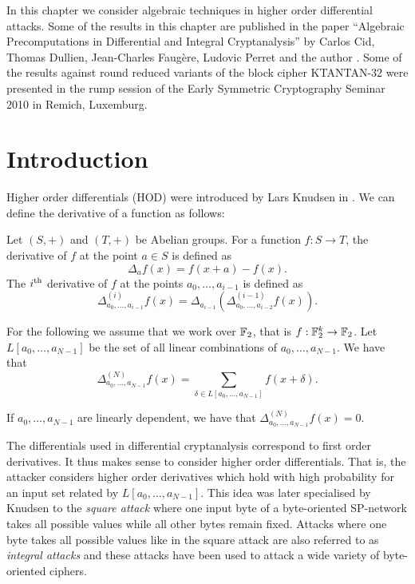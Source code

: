 In this chapter we consider algebraic techniques in higher order differential attacks. Some of the results in this chapter are published in the paper ``Algebraic Precomputations in Differential and Integral Cryptanalysis'' by Carlos Cid, Thomas Dullien, Jean-Charles Faugère, Ludovic Perret and the author \cite{acdfp:inscrypt2010}. Some of the results against round reduced variants of the block cipher KTANTAN-32 were presented in the rump session of the Early Symmetric Cryptography Seminar 2010 in Remich, Luxemburg.

\section{Introduction}
\label{sec:algebraic-integral-attacks}
Higher order differentials (HOD) were introduced by Lars Knudsen in \cite{Knudsen1995}. We can define the derivative of a function as follows:

\begin{definition} Let $(S, +)$ and $(T, +)$ be Abelian groups. For a function $f: S \rightarrow T$, the derivative of $f$ at the point $a \in S$ is defined as $$\Delta_a f(x) = f(x+a) - f(x).$$
The $i^{\textnormal{th}}$ derivative of $f$ at the points $a_0,\dots,a_{i-1}$ is defined as $$\Delta^{(i)}_{a_0,\dots,a_{i-1}} f(x) = \Delta_{a_{i-1}} (\Delta_{a_0,\dots,a_{i-2}}^{(i-1)} f(x)).$$
\end{definition}

For the following we assume that we work over $\mathbb{F}_2$, that is $f: \mathbb{F}_2^k \rightarrow \mathbb{F}_2$. Let $L[a_0,\dots,a_{N-1}]$ be the set of all linear combinations of $a_0,\dots,a_{N-1}$. We have that $$ \Delta^{(N)}_{a_0,\dots,a_{N-1}} f(x) = \sum_{\delta \in L[a_0,\dots,a_{N-1}]} f(x + \delta).$$

If $a_0,\dots,a_{N-1}$ are linearly dependent, we have that $\Delta^{(N)}_{a_0,\dots,a_{N-1}} f(x) = 0$.

The differentials used in differential cryptanalysis correspond to first order derivatives. It thus makes sense to consider higher order differentials. That is, the attacker considers higher order derivatives which hold with high probability for an input set related by $L[a_0,\dots,a_{N-1}]$. This idea was later specialised by Knudsen to the \emph{square attack} where one input byte of a byte-oriented SP-network takes all possible values while all other bytes remain fixed. Attacks where one byte takes all possible values like in the square attack are also referred to as \emph{integral attacks} and these attacks have been used to attack a wide variety of byte-oriented ciphers.

